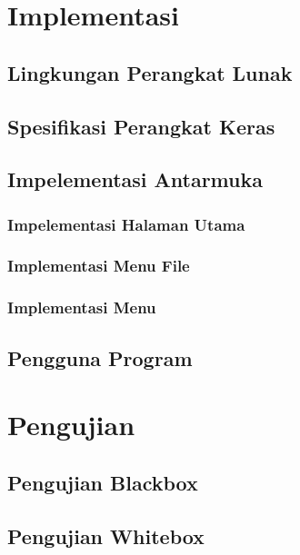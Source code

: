 \vspace{5cm}
\section{Implementasi}

\subsection{Lingkungan Perangkat Lunak}

\subsection{Spesifikasi Perangkat Keras}

\subsection{Impelementasi Antarmuka}

\subsubsection{Impelementasi Halaman Utama}

\subsubsection{Implementasi Menu File}

\subsubsection{Implementasi Menu}

\subsection{Pengguna Program}

\section{Pengujian}

\subsection{Pengujian Blackbox}

\subsection{Pengujian Whitebox}

\newpage